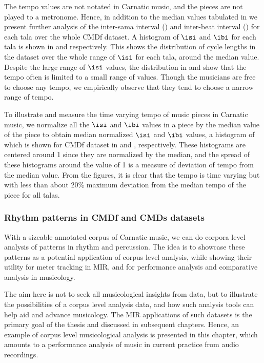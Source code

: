The tempo values are not notated in Carnatic music, and the pieces are not played to a metronome. Hence, in addition to the median values tabulated in  we present further analysis of the inter-\gls{sama} interval (\isi) and inter-beat interval (\ibi) for each \gls{tala} over the whole \acrshort{CMDf} dataset. A histogram of $\isi$ and $\ibi$ for each \gls{tala} is shown in  and  respectively. This shows the distribution of cycle lengths in the dataset over the whole range of $\isi$ for each \gls{tala}, around the median value. Despite the large range of $\isi$ values, the distribution in  and  show that the tempo often is limited to a small range of values. Though the musicians are free to choose any tempo, we empirically observe that they tend to choose a narrow range of tempo. 

To illustrate and measure the time varying tempo of music pieces in Carnatic music, we normalize all the $\isi$ and $\ibi$ values in a piece by the median value of the piece to obtain median normalized $\isi$ and $\ibi$ values, a histogram of which is shown for \acrshort{CMDf} dataset in  and , respectively. These histograms are centered around 1 since they are normalized by the median, and the spread of these histograms around the value of 1 is a measure of deviation of tempo from the median value. From the figures, it is clear that the tempo is time varying but with less than about 20\% maximum deviation from the median tempo of the piece for all \glspl{tala}. 
% 
\subsubsection{Rhythm patterns in \acrshort{CMDf} and \acrshort{CMDs} datasets}
With a sizeable annotated corpus of Carnatic music, we can do corpora level analysis of patterns in rhythm and percussion. The idea is to showcase these patterns as a potential application of corpus level analysis, while showing their utility for meter tracking in \gls{MIR}, and for performance analysis and comparative analysis in musicology. 

The aim here is not to seek all musicological insights from data, but to illustrate the possibilities of a corpus level analysis data, and how such analysis tools can help aid and advance musicology. The \gls{MIR} applications of such datasets is the primary goal of the thesis and discussed in subsequent chapters. Hence, an example of corpus level musicological analysis is presented in this chapter, which amounts to a performance analysis of music in current practice from audio recordings. 

